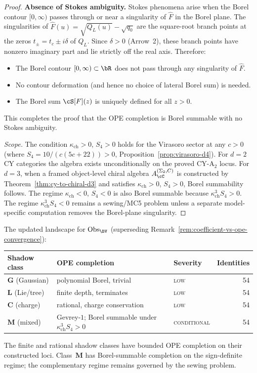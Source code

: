 \begin{proof}
\smallskip\noindent\textbf{Absence of Stokes ambiguity.}
Stokes phenomena arise when the Borel contour $[0, \infty)$ passes through or near a singularity of $\hat{F}$ in the Borel plane. The singularities of $\hat{F}(u) = \sqrt{Q_L(u)} - \sqrt{q_0}$ are the square-root branch points at the zeros $t_\pm = t_c \pm i\delta$ of $Q_L$. Since $\delta > 0$ (Arrow~2), these branch points have nonzero imaginary part and lie strictly off the real axis. Therefore:
\begin{itemize}
 \item The Borel contour $[0, \infty) \subset \bR$ does not pass through any singularity of $\hat{F}$.
 \item No contour deformation (and hence no choice of lateral Borel sum) is needed.
 \item The Borel sum $\cS[F](z)$ is uniquely defined for all $z > 0$.
\end{itemize}
This completes the proof that the OPE completion is Borel summable with no Stokes ambiguity.

\smallskip\noindent\textit{Scope.} The condition $\kappa_{\mathrm{ch}} > 0$, $S_4 > 0$ holds for the Virasoro sector at any $c > 0$ (where $S_4 = 10/(c(5c+22)) > 0$, Proposition~\ref{prop:virasoro-d4}). For $d = 2$ CY categories the algebra exists unconditionally on the proved CY-A$_2$ locus. For $d = 3$, when a framed object-level chiral algebra $A_\cC^{(\Sigma_2,C)}$ is constructed by Theorem~\ref{thm:cy-to-chiral-d3} and satisfies $\kappa_{\mathrm{ch}} > 0$, $S_4 > 0$, Borel summability follows. The regime $\kappa_{\mathrm{ch}} < 0$, $S_4 < 0$ is also Borel summable because $\kappa_{\mathrm{ch}}^3 S_4 > 0$. The regime $\kappa_{\mathrm{ch}}^3 S_4 < 0$ remains a sewing/MC5 problem unless a separate model-specific computation removes the Borel-plane singularity.
\end{proof}

\noindent The updated landscape for $\mathrm{Obs}_{\BV}$ (superseding Remark~\ref{rem:coefficient-vs-ope-convergence}):
\begin{center}
\renewcommand{\arraystretch}{1.2}
\small
\begin{tabular}{lllr}
 \toprule
 \textbf{Shadow class} & \textbf{OPE completion} & \textbf{Severity} & \textbf{Identities} \\
 \midrule
 $\mathbf{G}$ (Gaussian) & polynomial Borel, trivial & \textsc{low} & 54 \\
 $\mathbf{L}$ (Lie/tree) & finite depth, terminates & \textsc{low} & 54 \\
 $\mathbf{C}$ (charge) & rational, charge conservation & \textsc{low} & 54 \\
 $\mathbf{M}$ (mixed) & Gevrey-$1$; Borel summable under $\kappa_{\mathrm{ch}}^3S_4>0$ & \textsc{conditional} & 54 \\
 \bottomrule
\end{tabular}
\end{center}
The finite and rational shadow classes have bounded OPE completion on their constructed loci. Class~$\mathbf{M}$ has Borel-summable completion on the sign-definite regime; the complementary regime remains governed by the sewing problem.

